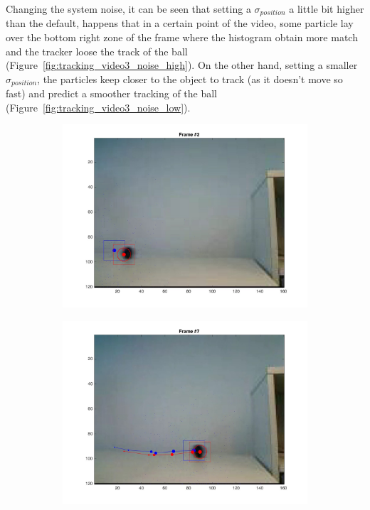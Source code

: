 \documentclass{ethz_report}
\begin{document}
Changing the system noise, it can be seen that setting a $\sigma_{position}$ a little bit higher than the default, happens that in a certain point of the video, some particle lay over the bottom right zone of the frame where the histogram obtain more match and the tracker loose the track of the ball (Figure~\ref{fig:tracking_video3_noise_high}). On the other hand, setting a smaller $\sigma_{position}$, the particles keep closer to the object to track (as it doesn't move so fast) and predict a smoother tracking of the ball (Figure~\ref{fig:tracking_video3_noise_low}).

\begin{figure}[h]
    \centering
    \begin{subfigure}[b]{.25\textwidth}
        \centering
        \includegraphics[width=1\linewidth]{images/video3_noise_high_1}
    \end{subfigure}%
    \begin{subfigure}[b]{.25\textwidth}
        \centering
        \includegraphics[width=1\linewidth]{images/video3_noise_high_6}

\end{subfigure}
\end{figure}
\end{document}
